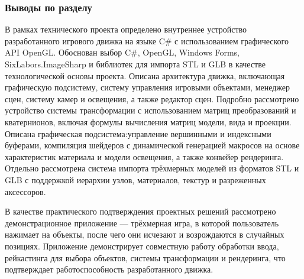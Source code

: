 \subsubsection{Выводы по разделу}
В рамках технического проекта определено внутреннее устройство разработанного игрового движка на языке C\# с использованием графического API OpenGL. Обоснован выбор C\#, OpenGL, Windows Forms, SixLabors.ImageSharp и библиотек для импорта STL и GLB в качестве технологической основы проекта. Описана архитектура движка, включающая графическую подсистему, систему управления игровыми объектами, менеджер сцен, систему камер и освещения, а также редактор сцен. Подробно рассмотрено устройство системы трансформации с использованием матриц преобразований и кватернионов, включая формулы вычисления матриц модели, вида и проекции. Описана графическая подсистема:управление вершинными и индексными буферами, компиляция шейдеров с динамической генерацией макросов на основе характеристик материала и модели освещения, а также конвейер рендеринга. Отдельно рассмотрена система импорта трёхмерных моделей из форматов STL и GLB с поддержкой иерархии узлов, материалов, текстур и разреженных аксессоров.

В качестве практического подтверждения проектных решений рассмотрено демонстрационное приложение — трёхмерная игра, в которой пользователь нажимает на объекты, после чего они исчезают и возрождаются в случайных позициях. Приложение демонстрирует совместную работу обработки ввода, рейкастинга для выбора объектов, системы трансформации и рендеринга, что подтверждает работоспособность разработанного движка.